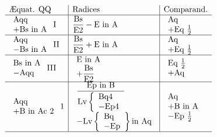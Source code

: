 \documentclass[11pt,a4paper]{article}
\begin{document}
\[ \begin{array}{l|l|l}
\text{Æquat. QQ} & \text{Radices} & \text{Comparand.} \\ \hline
\begin{array}{l} \text{Aqq} \\ +\text{Bs in A} \end{array} \;\text{I} & \dfrac{\text{Bs}}{\text{E2}} - \text{E in A} & \begin{array}{l} \text{Aq} \\ +\text{Eq } \tfrac{1}{2} \end{array} \\ \hline
\begin{array}{l} \text{Aqq} \\ -\text{Bs in A} \end{array} \;\text{II} & \dfrac{\text{Bs}}{\text{E2}} + \text{E in A} & \begin{array}{l} \text{Aq} \\ +\text{Eq } \tfrac{1}{2} \end{array} \\ \hline
\begin{array}{l} \text{Bs in A} \\ -\text{Aqq} \end{array} \;\text{III} & \begin{array}{l} \text{E in A} \\ +\dfrac{\text{Bs}}{\text{E2}} \end{array} & \begin{array}{l} \text{Eq } \tfrac{1}{2} \\ +\text{Aq} \end{array} \\ \hline
\begin{array}{l} \text{Aqq} \\ +\text{B in Ac 2} \end{array} \;\text{1} & \begin{array}{l} \dfrac{\text{Ep in B}}{\text{Lv}\left\{\begin{array}{l} \text{Bq4} \\ -\text{Ep4} \end{array}\right.} \\ -\text{Lv}\left\{\begin{array}{l} \text{Bq} \\ -\text{Ep} \end{array}\right\} \text{in Aq} \end{array} & \begin{array}{l} \text{Aq} \\ +\text{B in A} \\ -\text{Ep } \tfrac{1}{2} \end{array} \\ \hline

\end{array}\]
\end{document}
